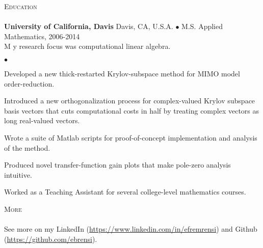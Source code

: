 \documentclass{article}
\newcommand{\lineunder}{\vspace*{-8pt} \\ \hspace*{-18pt} \hrulefill \\}
\newcommand{\header}[1]{{\hspace*{-15pt}\vspace*{6pt} \textsc{#1}} \vspace*{-6pt} \lineunder}
\newenvironment{achievements}{\begin{list}{$\bullet$}{\topsep 0pt \itemsep -2pt}}{\vspace*{4pt}\end{list}}
\newcommand{\school}[4]{
 \textbf{#1} #2 $\bullet$ #3\\
#4
}
\begin{document}
\header{Education}
\school{University of California, Davis}{Davis, CA, U.S.A.}{M.S. Applied Mathematics, 2006-2014}

My research focus was computational linear algebra.
\begin{achievements}
\item Developed a new thick-restarted Krylov-subspace method for MIMO model order-reduction.
\item Introduced a new orthogonalization process for complex-valued Krylov subspace basis vectors that cuts computational costs in half by treating complex vectors as long real-valued vectors.
\item Wrote a suite of Matlab scripts for proof-of-concept implementation and analysis of the method.
\item  Produced novel transfer-function gain plots that make pole-zero analysis intuitive.
\item Worked as a Teaching Assistant for several college-level mathematics courses.
\end{achievements}
\medskip

\header{More}
See more on my LinkedIn (\url{https://www.linkedin.com/in/efremrensi}) and Github (\url{https://github.com/ebrensi}). 
\end{document}
